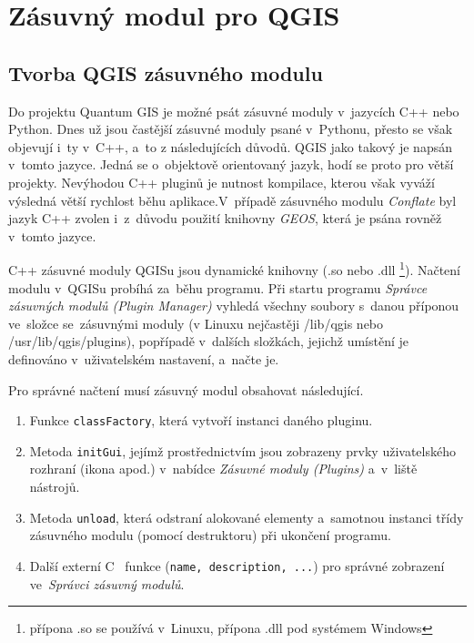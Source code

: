 \chapter{Zásuvný modul pro QGIS}
\label{6-plugin}

\section{Tvorba QGIS zásuvného modulu}
\label{plugin-tvorba}

Do projektu Quantum GIS je možné psát zásuvné moduly v~jazycích C++ nebo Python.
Dnes už jsou častější zásuvné moduly psané v~Pythonu, přesto se však objevují
i~ty v~C++, a~to z následujících důvodů. QGIS jako takový je napsán v~tomto 
jazyce. Jedná se o~objektově orientovaný jazyk, hodí se proto pro větší projekty. 
Nevýhodou C++ pluginů je nutnost kompilace, kterou však vyváží výsledná větší 
rychlost běhu aplikace.V~případě zásuvného modulu \textit{Conflate} byl jazyk 
C++ zvolen i~z~důvodu použití knihovny \textit{GEOS}, která je psána rovněž 
v~tomto jazyce.


C++ zásuvné moduly QGISu jsou dynamické knihovny (.so nebo .dll
\footnote{ přípona .so se používá v~Linuxu, přípona .dll pod systémem Windows}).
Načtení modulu v~QGISu probíhá za~běhu programu. Při startu programu 
\textit{Správce zásuvných modulů (Plugin Manager)} vyhledá všechny soubory 
s~danou příponou ve~složce se~zásuvnými moduly (v Linuxu nejčastěji /lib/qgis
nebo /usr/lib/qgis/plugins), popřípadě v~dalších složkách, jejichž umístění
je definováno v~uživatelském nastavení, a~načte je.

Pro správné načtení musí zásuvný modul obsahovat následující.

\begin{enumerate}
 \item Funkce \texttt{classFactory}, která vytvoří instanci daného pluginu.
 \item Metoda \texttt{initGui}, jejímž prostřednictvím jsou zobrazeny prvky 
	uživatelského rozhraní (ikona apod.) v~nabídce \textit{Zásuvné moduly 
	(Plugins)} a~v~liště nástrojů.
 \item Metoda \texttt{unload}, která odstraní alokované elementy a~samotnou
	instanci třídy zásuvného modulu (pomocí destruktoru) při ukončení 
	programu.
 \item Další externí C ~funkce (\texttt{name, description, ...}) pro správné
	zobrazení ve~\textit{Správci zásuvný modulů}.
\end{enumerate}

